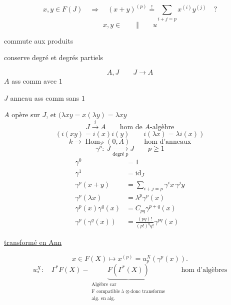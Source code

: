 \[
x,y\in F(J)\quad\Longrightarrow\quad
(x+y)^{(p)}\overset{!}{=}\sum_{i+j=p}x^{(i)}y^{(j)}\quad?
\]
\[x,y\in\qquad\Vert\qquad u\]

commute aux produits\par
conserve degré et degrés partiels

\[
A,J\qquad J\longrightarrow A
\]
$A$   ass comm avec $1$\par
$J$ anneau ass comm sans $1$\par
$A$ opère sur $J$, et $(\lambda xy=x(\lambda y)=\lambda xy$
\[
J\xrightarrow{i} A\qquad\text{hom de }A\text{-}\text{algèbre}
\]
\[
(i(xy)=i(x)i(y)\qquad i(\lambda x)=\lambda i(x))
\]
\[
k\longrightarrow\operatorname{Hom}_{\mathcal P}(0,A)\qquad\text{hom d'anneaux}
\]
\[
\gamma^p:\ J\xrightarrow[\text{degré }p]{}J\qquad p\geq1
\]
\[
\begin{aligned}
\gamma^0&=1\\
\gamma^1&=\mathrm{id}_J\\
\gamma^p(x+y)&=\sum_{i+j=p}\gamma^i x\,\gamma^j y\\
\gamma^p(\lambda x)&=\lambda^p\gamma^p(x)\\
\gamma^p(x)\gamma^q(x)&=C_{pq}\gamma^{p+q}(x)\\
\gamma^p(\gamma^q(x))&=\frac{(pq)!}{(p!)^q q!}\gamma^{pq}(x)
\end{aligned}
\]

\uline{transformé en Ann}


\[
x\in F(X)\longmapsto x^{(p)}=u_p^X(\gamma^p(x)).
\]
\[
u_*^X:\quad \Gamma^*F(X)-
\underbrace{F(\Gamma^*(X))}_{\substack{\text{Algèbre car}\\
\text{F compatible à }\otimes\ \text{donc transforme}\\
\text{alg. en alg.}}}
\qquad \text{hom d'algèbres}
\]

